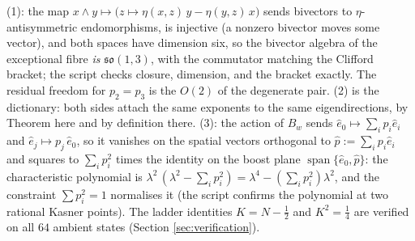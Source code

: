 (1): the map $x \wedge y \mapsto \bigl(z \mapsto \eta(x,z)\,y - \eta(y,z)\,x\bigr)$ sends bivectors to $\eta$-antisymmetric endomorphisms, is injective (a nonzero bivector moves some vector), and both spaces have dimension six, so the bivector algebra of the exceptional fibre \emph{is} $\mathfrak{so}(1,3)$, with the commutator matching the Clifford bracket; the script checks closure, dimension, and the bracket exactly. The residual freedom for $p_2 = p_3$ is the $O(2)$ of the degenerate pair. (2) is the dictionary: both sides attach the same exponents to the same eigendirections, by Theorem  here and by definition there. (3): the action of $B_w$ sends $\hat e_0 \mapsto \sum_i p_i \hat e_i$ and $\hat e_j \mapsto p_j\, \hat e_0$, so it vanishes on the spatial vectors orthogonal to $\hat p := \sum_i p_i \hat e_i$ and squares to $\sum_i p_i^2$ times the identity on the boost plane $\operatorname{span}\{\hat e_0, \hat p\}$: the characteristic polynomial is $\lambda^2\,(\lambda^2 - \sum_i p_i^2) = \lambda^4 - (\sum_i p_i^2)\lambda^2$, and the constraint $\sum p_i^2 = 1$ normalises it (the script confirms the polynomial at two rational Kasner points). The ladder identities $K = N - \tfrac12$ and $K^2 = \tfrac14$ are verified on all $64$ ambient states (Section \ref{sec:verification}).

